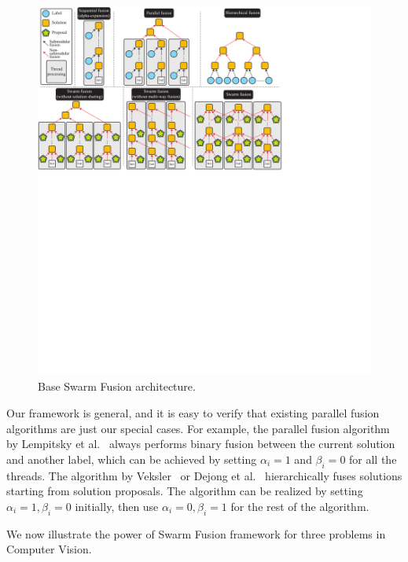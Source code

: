 \begin{figure}[tb]
 \includegraphics[width=\columnwidth]{figure/model.pdf}
 \caption{Base Swarm Fusion architecture.}\label{fig:base}
\end{figure}

 Our framework is
general, and it is easy to verify that existing parallel fusion
algorithms are just our special cases.
%
For example, the parallel fusion algorithm by Lempitsky et
al.~\cite{viktor} always performs binary fusion between the current
solution and another label, which can be achieved by setting $\alpha_i =
1$ and $\beta_i = 0$ for all the threads. The algorithm by
Veksler~\cite{olga} or Dejong et al.~\cite{dejong} hierarchically fuses
solutions starting from solution proposals. The algorithm can be
realized by setting $\alpha_i = 1, \beta_i = 0$ initially, then use
$\alpha_i = 0, \beta_i=1$  for the rest of the algorithm.

\noindent
We now illustrate the power of Swarm Fusion framework for three problems
in Computer Vision. 






